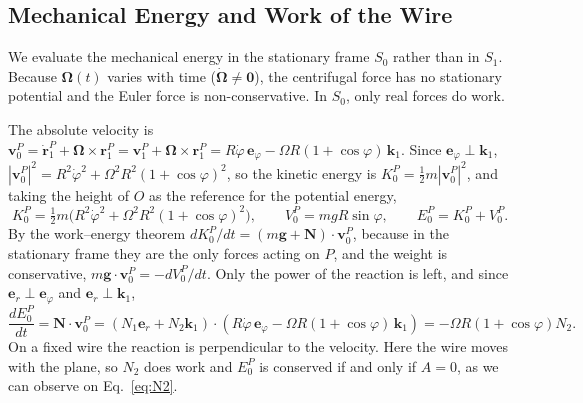 \documentclass[11pt,a4paper]{article}
\numberwithin{equation}{section}
\newcommand{\er}{\mathbf{e}_r}
\newcommand{\ephi}{\mathbf{e}_\varphi}
\newcommand{\kk}{\mathbf{k}_1}
\newcommand{\rr}{\mathbf{r}_1^P}
\newcommand{\vv}{\mathbf{v}_0^P}
\newcommand{\NN}{\mathbf{N}}
\newcommand{\Om}{\boldsymbol{\Omega}}
\newcommand{\dph}{\dot\varphi}
\begin{document}
\subsection{Mechanical Energy and Work of the Wire}
We evaluate the mechanical energy in the stationary frame $S_0$ rather than in $S_1$. Because $\boldsymbol{\Omega}(t)$ varies with time ($\dot{\boldsymbol{\Omega}}\neq\mathbf{0}$), the centrifugal force has no stationary potential and the Euler force is non-conservative. In $S_0$, only real forces do work.

The absolute velocity is $\vv=\dot{\mathbf{r}}_1^P+\Om\times\rr=\mathbf{v}_1^P+\Om\times\rr=R\dph\,\ephi-\Omega R(1+\cos\varphi)\,\kk$. Since $\ephi\perp\kk$, $|\vv|^2=R^2\dph^2+\Omega^2 R^2(1+\cos\varphi)^2$, so the kinetic energy is $K_0^P=\tfrac12m|\vv|^2$, and taking the height of $O$ as the reference for the potential energy,
\begin{equation}
K_0^P=\tfrac12 m\big(R^2\dph^2+\Omega^2 R^2(1+\cos\varphi)^2\big),\qquad V_0^P=mgR\sin\varphi,\qquad E_0^P=K_0^P+V_0^P .\label{eq:E}
\end{equation}
By the work--energy theorem $dK_0^P/dt=(m\mathbf{g}+\NN)\cdot\vv$, because in the stationary frame they are the only forces acting on $P$, and the weight is conservative, $m\mathbf{g}\cdot\vv=-dV_0^P/dt$. Only the power of the reaction is left, and since $\er\perp\ephi$ and $\er\perp\kk$,
\begin{equation}
\frac{dE_0^P}{dt}=\NN\cdot\vv=(N_1\er+N_2\kk)\cdot(R\dph\,\ephi-\Omega R(1+\cos\varphi)\,\kk)=-\Omega R(1+\cos\varphi) N_2 .\label{eq:Edot}
\end{equation}
On a fixed wire the reaction is perpendicular to the velocity. Here the wire moves with the plane, so $N_2$ does work and $E_0^P$ is conserved if and only if $A=0$, as we can observe on Eq.~\eqref{eq:N2}.
\end{document}

